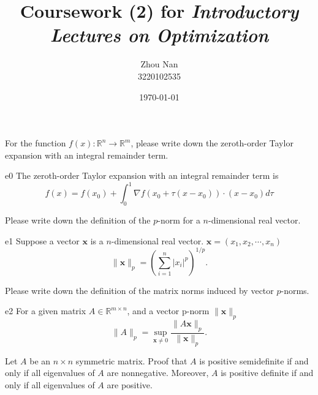 \documentclass{article}
\title{Coursework (2) for \emph{Introductory Lectures on Optimization}}
\author{Zhou Nan \\ 3220102535}
\date{\today}
\newcommand{\RBB}{\mathbb{R}}
\newcommand{\xB}{\mathbf{x}}
\begin{document}
\maketitle

\begin{excercise}\label{e0}
For the function $f(x): \mathbb{R}^n \rightarrow \mathbb{R}^m$, please write down the zeroth-order Taylor expansion with an integral remainder term.
\end{excercise}

\begin{SOLUTION}{e0}
The zeroth-order Taylor expansion with an integral remainder term is
\[
f(x) = f(x_0) + \int_0^1 \nabla f(x_0 + \tau(x - x_0)) \cdot (x- x_0) d\tau
\]
\end{SOLUTION}

\begin{excercise}\label{e1}
Please write down the definition of the $p$-norm for a $n$-dimensional real vector.
\end{excercise}

\begin{SOLUTION}{e1}
Suppose a vector $\xB$ is a $n$-dimensional real vector. $\xB = (x_1, x_2, \cdots, x_n)$
\[
	\|\xB\|_p = \left(\sum_{i=1}^n |x_i|^p\right)^{1/p}.
\]
\end{SOLUTION}

\begin{excercise}\label{e2}
Please write down the definition of the matrix norms induced by vector $p$-norms.
\end{excercise}

\begin{SOLUTION}{e2}
For a given matrix $A \in \RBB^{m \times n}$, and a vector p-norm $\|\xB\|_p$
\[
	\|A\|_p = \sup_{\xB \neq 0} \frac{\|A\xB\|_p}{\|\xB\|_p}.
\]
\end{SOLUTION}

\newpage
\begin{excercise}\label{e3}
	Let $A$ be an $n \times n$ symmetric matrix. Proof that $A$ is positive semidefinite if and only if all eigenvalues of $A$ are nonnegative. Moreover, $A$ is positive definite if and only if all eigenvalues of $A$ are positive.
\end{excercise}
\end{document}
